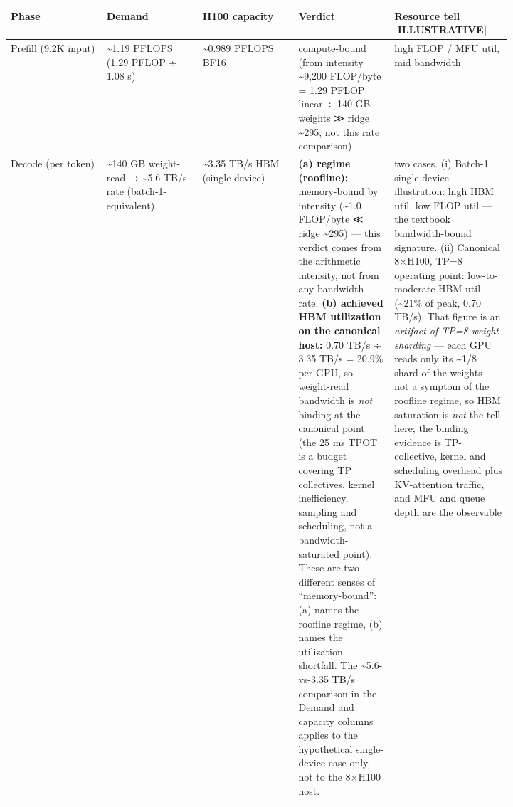 \nopagebreak[4]
\begin{longtable}[]{@{}
  >{\raggedright\arraybackslash}p{0.1647\linewidth}
  >{\raggedright\arraybackslash}p{0.1647\linewidth}
  >{\raggedright\arraybackslash}p{0.1647\linewidth}
  >{\raggedright\arraybackslash}p{0.1647\linewidth}
  >{\raggedright\arraybackslash}p{0.1647\linewidth}@{}}
\toprule\noalign{}
\begin{minipage}[b]{\linewidth}\raggedright
Phase
\end{minipage} & \begin{minipage}[b]{\linewidth}\raggedright
Demand
\end{minipage} & \begin{minipage}[b]{\linewidth}\raggedright
H100 capacity
\end{minipage} & \begin{minipage}[b]{\linewidth}\raggedright
Verdict
\end{minipage} & \begin{minipage}[b]{\linewidth}\raggedright
Resource tell \mbox{{[}ILLUSTRATIVE{]}}
\end{minipage} \\
\midrule\noalign{}
\endhead
\bottomrule\noalign{}
\endlastfoot
Prefill (9.2K input) & \textasciitilde1.19 PFLOPS (1.29 PFLOP ÷ 1.08 s)
& \textasciitilde0.989 PFLOPS BF16 & compute-bound (from intensity
\textasciitilde9,200 FLOP/byte = 1.29 PFLOP linear ÷ 140 GB weights ≫
ridge \textasciitilde295, not this rate comparison) & high FLOP / MFU
util, mid bandwidth \\
\noalign{\label{tab:6.1}}
Decode (per token) & \textasciitilde140 GB weight-read →
\textasciitilde5.6 TB/s rate (batch-1-equivalent) & \textasciitilde3.35
TB/s HBM (single-device) & \textbf{(a) regime (roofline):} memory-bound
by intensity (\textasciitilde1.0 FLOP/byte ≪ ridge \textasciitilde295)
--- this verdict comes from the arithmetic intensity, not from any
bandwidth rate. \textbf{(b) achieved HBM utilization on the canonical
host:} 0.70 TB/s ÷ 3.35 TB/s = 20.9\% per GPU, so weight-read bandwidth
is \emph{not} binding at the canonical point (the 25 ms TPOT is a budget
covering TP collectives, kernel inefficiency, sampling and scheduling,
not a bandwidth-saturated point). These are two different senses of
``memory-bound'': (a) names the roofline regime, (b) names the
utilization shortfall. The \textasciitilde5.6-vs-3.35 TB/s comparison in
the Demand and capacity columns applies to the hypothetical
single-device case only, not to the 8×H100 host. & two cases. (i)
Batch-1 single-device illustration: high HBM util, low FLOP util --- the
textbook bandwidth-bound signature. (ii) Canonical 8×H100, TP=8
operating point: low-to-moderate HBM util (\textasciitilde21\% of peak,
0.70 TB/s). That figure is an \emph{artifact of TP=8 weight sharding}
--- each GPU reads only its \textasciitilde1/8 shard of the weights ---
not a symptom of the roofline regime, so HBM saturation is \emph{not}
the tell here; the binding evidence is TP-collective, kernel and
scheduling overhead plus KV-attention traffic, and MFU and queue depth
are the observable \\
\end{longtable}

